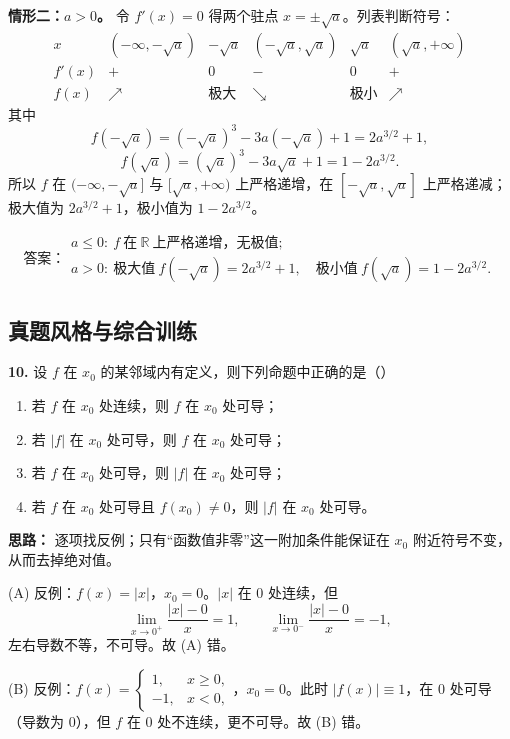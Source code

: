 \textbf{情形二：$a>0$。} 令 $f'(x)=0$ 得两个驻点 $x=\pm\sqrt a$。列表判断符号：
\[
\begin{array}{c|ccccc}
x & (-\infty,-\sqrt a) & -\sqrt a & (-\sqrt a,\sqrt a) & \sqrt a & (\sqrt a,+\infty)\\
\hline
f'(x) & + & 0 & - & 0 & +\\
f(x) & \nearrow & \text{极大} & \searrow & \text{极小} & \nearrow
\end{array}
\]
其中
\[
f(-\sqrt a)=(-\sqrt a)^3-3a(-\sqrt a)+1=2a^{3/2}+1,
\]
\[
f(\sqrt a)=(\sqrt a)^3-3a\sqrt a+1=1-2a^{3/2}.
\]
所以 $f$ 在 $(-\infty,-\sqrt a]$ 与 $[\sqrt a,+\infty)$ 上严格递增，在 $[-\sqrt a,\sqrt a]$ 上严格递减；极大值为 $2a^{3/2}+1$，极小值为 $1-2a^{3/2}$。

\[
\boxed{\text{答案：}\begin{gathered}
a\le0:\ f\ \text{在}\ \mathbb R\ \text{上严格递增，无极值};\\
a>0:\ \text{极大值}\ f(-\sqrt a)=2a^{3/2}+1,\quad
\text{极小值}\ f(\sqrt a)=1-2a^{3/2}.
\end{gathered}}
\]
\else \answerarea[10] \fi%

\subsection{真题风格与综合训练}

\textbf{10.} 设 $f$ 在 $x_0$ 的某邻域内有定义，则下列命题中正确的是（\quad）

\begin{enumerate}[label=(\Alph*),leftmargin=2.5em]
  \item 若 $f$ 在 $x_0$ 处连续，则 $f$ 在 $x_0$ 处可导；
  \item 若 $|f|$ 在 $x_0$ 处可导，则 $f$ 在 $x_0$ 处可导；
  \item 若 $f$ 在 $x_0$ 处可导，则 $|f|$ 在 $x_0$ 处可导；
  \item 若 $f$ 在 $x_0$ 处可导且 $f(x_0)\ne0$，则 $|f|$ 在 $x_0$ 处可导。
\end{enumerate}

\ifshowsolutions%

\textbf{思路：} 逐项找反例；只有“函数值非零”这一附加条件能保证在 $x_0$ 附近符号不变，从而去掉绝对值。

(A) 反例：$f(x)=|x|$，$x_0=0$。$|x|$ 在 $0$ 处连续，但
\[
\lim_{x\to0^+}\frac{|x|-0}{x}=1,\qquad
\lim_{x\to0^-}\frac{|x|-0}{x}=-1,
\]
左右导数不等，不可导。故 (A) 错。

(B) 反例：$f(x)=\begin{cases}1,&x\ge0,\\-1,&x<0,\end{cases}$，$x_0=0$。此时 $|f(x)|\equiv1$，在 $0$ 处可导（导数为 $0$），但 $f$ 在 $0$ 处不连续，更不可导。故 (B) 错。

